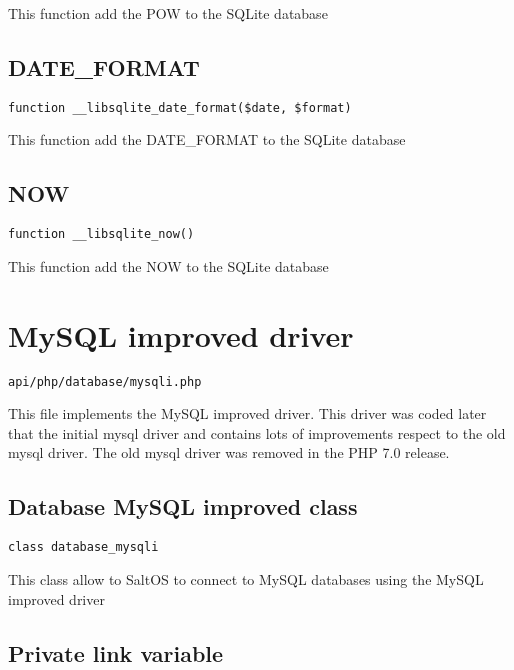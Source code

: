 \documentclass[a4paper]{book}
\begin{document}
This function add the POW to the SQLite database

\hypertarget{toc354}{}
\subsection{DATE\_FORMAT}

\begin{lstlisting}
function __libsqlite_date_format($date, $format)
\end{lstlisting}

This function add the DATE\_FORMAT to the SQLite database

\hypertarget{toc355}{}
\subsection{NOW}

\begin{lstlisting}
function __libsqlite_now()
\end{lstlisting}

This function add the NOW to the SQLite database

\hypertarget{toc356}{}
\section{MySQL improved driver}

\begin{lstlisting}
api/php/database/mysqli.php
\end{lstlisting}

This file implements the MySQL improved driver. This driver was coded later that the initial
mysql driver and contains lots of improvements respect to the old mysql driver. The old mysql
driver was removed in the PHP 7.0 release.

\hypertarget{toc357}{}
\subsection{Database MySQL improved class}

\begin{lstlisting}
class database_mysqli
\end{lstlisting}

This class allow to SaltOS to connect to MySQL databases using the MySQL improved driver

\hypertarget{toc358}{}
\subsection{Private link variable}
\end{document}
